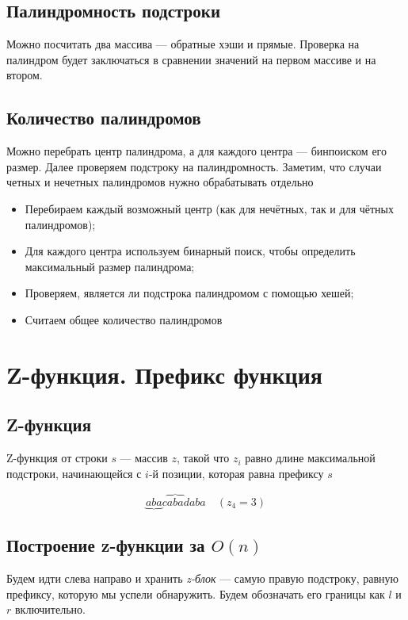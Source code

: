 \documentclass[a4paper]{article}
\begin{document}
\subsection{Палиндромность подстроки}
Можно посчитать два массива — обратные хэши и прямые. Проверка на палиндром будет заключаться в сравнении значений  на первом массиве и на втором.

\subsection{Количество палиндромов}
Можно перебрать центр палиндрома, а для каждого центра — бинпоиском его размер. Далее проверяем подстроку на палиндромность. Заметим, что случаи четных и нечетных палиндромов нужно обрабатывать отдельно

\begin{itemize}
    \item Перебираем каждый возможный центр (как для нечётных, так и для чётных палиндромов);
    \item Для каждого центра используем бинарный поиск, чтобы определить максимальный размер палиндрома;
    \item Проверяем, является ли подстрока палиндромом с помощью хешей;
    \item Считаем общее количество палиндромов
\end{itemize}

\newpage
\section{Z-функция. Префикс функция}
\subsection{Z-функция}
Z-функция от строки $s$ — массив $z$, такой что $z_i$ равно длине максимальной подстроки, начинающейся с $i$-й позиции, которая равна префиксу $s$

$$
\underbrace{aba}c\overbrace{aba}daba \hspace{1em} (z_4 = 3)
$$

\subsection{Построение z-функции за $O(n)$}
Будем идти слева направо и хранить \textit{z-блок} — самую правую подстроку, равную префиксу, которую мы успели обнаружить. Будем обозначать его границы как $l$ и $r$ включительно.
\end{document}
